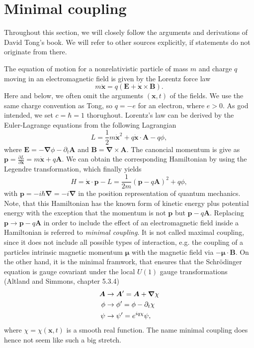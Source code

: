 \documentclass[../../main]{subfiles}
\begin{document}
\section{Minimal coupling}
\label{sec:minimal_coupling}
Throughout this section, we will closely follow the arguments and derivations of David Tong's book. We will refer to other sources explicitly, if statements do not originate from there. 

The equation of motion for a nonrelativistic particle of mass $m$ and charge $q$ moving in an electromagnetic field is given by the Lorentz force law
\begin{equation}
    m \ddot{\bm{x}} = q(\bm{E} + \dot{\bm{x}} \times \bm{B}).
\end{equation}
Here and below, we often omit the arguments $(\bm x, t)$ of the fields. We use the same charge convention as Tong, so $q=-e$ for an electron, where $e>0$. As god intended, we set \(c = \hbar = 1\) thorughout. Lorentz's law can be derived by the Euler-Lagrange equations from the following Lagrangian
\begin{equation}
    L = \frac 12 m  \dot{\bm{x}}^2 + q \dot{\bm{x}} \cdot \bm{A} - q\phi , 
\end{equation}
where $\bm E = -\bm \nabla \phi - \partial_t \bm A$ and $\bm B = \bm \nabla \times \bm A$. The canoncial momentum is give as $\bm{p} = \frac{\partial L}{\partial \dot{\bm{x}}} = m \dot{\bm{x}} + q\bm{A}$. We can obtain the corresponding Hamiltonian by using the Legendre transformation, which finally yields
\begin{equation}
    H = \dot{\bm{x}} \cdot \bm{p} - L = \frac{1}{2m}(\bm{p} - q\bm{A})^2 + q\phi ,
\end{equation}
with \(\bm{p}=-i\hbar\bm{\nabla}=-i\bm{\nabla}\) in the position representation of quantum mechanics. Note, that this Hamiltonian has the known form of kinetic energy plus potential energy with the exception that the momentum is not $\bm{p}$ but $\bm{p}-q\bm{A}$. Replacing $\bm{p} \to \bm{p} - q\bm{A}$ in order to include the effect of an electromagnetic field inside a Hamiltonian is referred to \emph{minimal coupling}. It is not called maximal coupling, since it does not include all possible types of interaction, e.g. the coupling of a particles intrinsic magnetic momentum $\bm \mu$ with the magnetic field via $-\bm \mu \cdot \bm B$. On the other hand, it is the minimal framwork, that ensures that the Schrödinger equation is gauge covariant under the local $U(1)$ gauge transformations (Altland and Simmons, chapter 5.3.4)
\begin{align}
    \bm{A} &\to \bm{A}' = \bm{A}+\bm{\nabla}\chi \notag \\
    \phi   &\to \phi' = \phi-\partial_t\chi \\
    \psi   &\to \psi' = e^{iq\chi} \psi , \notag
\end{align} \label{eq:minimal_coupling_gauge_transformations}
where $\chi=\chi(\bm{x},t)$ is a smooth real function. The name minimal coupling does hence not seem like such a big stretch.
\end{document}
